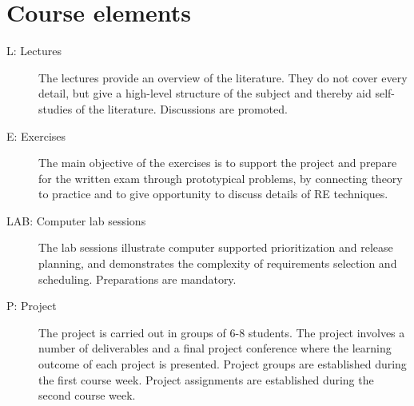\documentclass[10pt,a4paper]{article}
\begin{document}
\newpage

\section{Course elements}
\begin{description}
\item[L: Lectures] The lectures provide an overview of the literature. They do not cover every detail, but give a high-level structure of the subject and thereby aid self-studies of the literature. Discussions are promoted.
\item[E: Exercises] The main objective of the exercises is to support the project and prepare for the written exam through prototypical problems, by connecting theory to practice and to give opportunity to discuss details of RE techniques.
\item[LAB: Computer lab sessions] The lab sessions illustrate computer supported
prioritization and release planning, and demonstrates the complexity of requirements selection and scheduling. Preparations are mandatory. 
\item[P: Project] The project is carried out in groups of 6-8 students. The project involves a number of deliverables and a final project conference where the learning outcome of each project is presented. Project groups are established during the first course week. Project assignments are established during the second course week.
\end{description}
\end{document}
